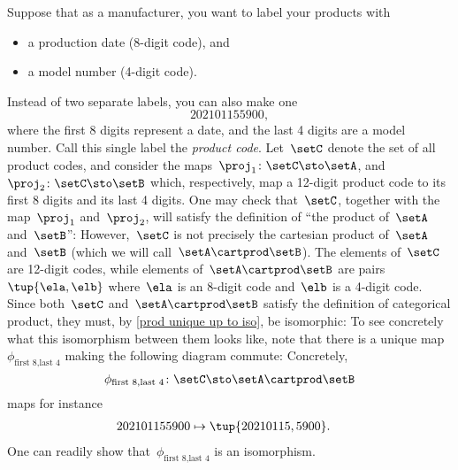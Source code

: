 \begin{example}
    \label{ex:univ-prop-prod}
    Suppose that as a manufacturer, you want to label your products with
    \begin{itemize}
        \item a production date (8-digit code), and
        \item a model number (4-digit code).
    \end{itemize}
    Instead of two separate labels, you can also make one
    \begin{equation}
        \label{eq:exa-prod-univ-prop-code}
        202101155900,
    \end{equation}
    where the first 8 digits represent a date, and the last 4 digits are a model number.
    Call this single label the \emph{product code}.
    Let~$\setC$ denote the set of all product codes, and consider the maps~$\proj_1\colon \setC \sto \setA$, and~$\proj_2\colon \setC \sto \setB$ which, respectively, map a 12-digit product code to its first 8 digits and its last 4 digits.
    One may check that~$\setC$, together with the map~$\proj_1$ and~$\proj_2$, will satisfy the definition of ``the product of~$\setA$ and~$\setB$'':
    However,~$\setC$ is not precisely the cartesian product of~$\setA$ and~$\setB$ (which we will call~$\setA\cartprod \setB$).
    The elements of~$\setC$ are 12-digit codes, while elements of~$\setA\cartprod \setB$ are pairs~$\tup{\ela,\elb}$ where~$\ela$ is an 8-digit code and~$\elb$ is a 4-digit code.
    Since both~$\setC$ and~$\setA\cartprod \setB$ satisfy the definition of categorical product, they must, by \cref{prod unique up to iso}, be isomorphic:
    To see concretely what this isomorphism between them looks like, note that there is a unique map $\phi_{\text{first 8},\text{last 4}}$ making the following diagram commute:
    Concretely,
    \begin{equation}
        \label{eq:exa-univ-iso}
        \phi_{\text{first 8},\text{last 4}}\colon \setC \sto \setA\cartprod \setB
    \end{equation}
    maps for instance
    \begin{equation}
        \label{eq:exa-univ-iso-concrete}
        \begin{aligned}
            202101155900 & \mapsto \tup{20210115,5900}.
        \end{aligned}
    \end{equation}
    One can readily show that~$\phi_{\text{first 8},\text{last 4}}$ is an isomorphism.
\end{example}

